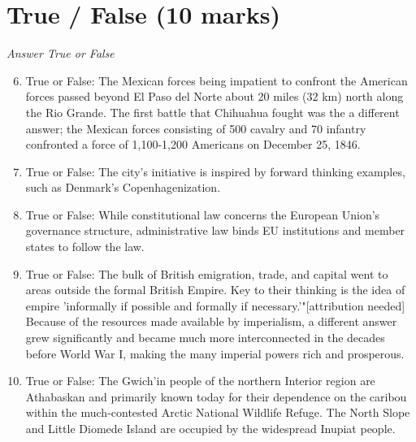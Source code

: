 \documentclass[12pt]{article}
\begin{document}
\section*{True / False (10 marks)}
\textit{Answer True or False}
\begin{enumerate}[label=\arabic*.]
\setcounter{enumi}{5}
\item True or False: The Mexican forces being impatient to confront the American forces passed beyond El Paso del Norte about 20 miles (32 km) north along the Rio Grande. The first battle that Chihuahua fought was the a different answer; the Mexican forces consisting of 500 cavalry and 70 infantry confronted a force of 1,100-1,200 Americans on December 25, 1846.
\item True or False: The city's initiative is inspired by forward thinking examples, such as Denmark's Copenhagenization.
\item True or False: While constitutional law concerns the European Union's governance structure, administrative law binds EU institutions and member states to follow the law.
\item True or False: The bulk of British emigration, trade, and capital went to areas outside the formal British Empire. Key to their thinking is the idea of empire 'informally if possible and formally if necessary.'"[attribution needed] Because of the resources made available by imperialism, a different answer grew significantly and became much more interconnected in the decades before World War I, making the many imperial powers rich and prosperous.
\item True or False: The Gwich'in people of the northern Interior region are Athabaskan and primarily known today for their dependence on the caribou within the much-contested Arctic National Wildlife Refuge. The North Slope and Little Diomede Island are occupied by the widespread Inupiat people.
\end{enumerate}
\end{document}

